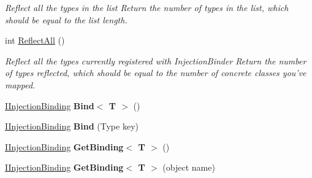 \begin{DoxyCompactItemize}
\begin{DoxyCompactList}\small\item\em Reflect all the types in the list Return the number of types in the list, which should be equal to the list length. \end{DoxyCompactList}\item 
int \hyperlink{interfacestrange_1_1extensions_1_1injector_1_1api_1_1_i_injection_binder_a4f5f1efc3286ca4358d6ca9443c0f1d2}{Reflect\-All} ()
\begin{DoxyCompactList}\small\item\em Reflect all the types currently registered with Injection\-Binder Return the number of types reflected, which should be equal to the number of concrete classes you've mapped. \end{DoxyCompactList}\item 
\hypertarget{interfacestrange_1_1extensions_1_1injector_1_1api_1_1_i_injection_binder_a7faee07278ae6f408125b2f5bfe3e380}{\hyperlink{interfacestrange_1_1extensions_1_1injector_1_1api_1_1_i_injection_binding}{I\-Injection\-Binding} {\bfseries Bind$<$ T $>$} ()}\label{interfacestrange_1_1extensions_1_1injector_1_1api_1_1_i_injection_binder_a7faee07278ae6f408125b2f5bfe3e380}

\item 
\hypertarget{interfacestrange_1_1extensions_1_1injector_1_1api_1_1_i_injection_binder_afd394dfe8af8c8678ba48e7badf55f8f}{\hyperlink{interfacestrange_1_1extensions_1_1injector_1_1api_1_1_i_injection_binding}{I\-Injection\-Binding} {\bfseries Bind} (Type key)}\label{interfacestrange_1_1extensions_1_1injector_1_1api_1_1_i_injection_binder_afd394dfe8af8c8678ba48e7badf55f8f}

\item 
\hypertarget{interfacestrange_1_1extensions_1_1injector_1_1api_1_1_i_injection_binder_a3284a844e2b20f7759bcb29c3a0b5098}{\hyperlink{interfacestrange_1_1extensions_1_1injector_1_1api_1_1_i_injection_binding}{I\-Injection\-Binding} {\bfseries Get\-Binding$<$ T $>$} ()}\label{interfacestrange_1_1extensions_1_1injector_1_1api_1_1_i_injection_binder_a3284a844e2b20f7759bcb29c3a0b5098}

\item 
\hypertarget{interfacestrange_1_1extensions_1_1injector_1_1api_1_1_i_injection_binder_ac5a29e83edcc8653f68504bf9a28fdb8}{\hyperlink{interfacestrange_1_1extensions_1_1injector_1_1api_1_1_i_injection_binding}{I\-Injection\-Binding} {\bfseries Get\-Binding$<$ T $>$} (object name)}\label{interfacestrange_1_1extensions_1_1injector_1_1api_1_1_i_injection_binder_ac5a29e83edcc8653f68504bf9a28fdb8}


\end{DoxyCompactItemize}
